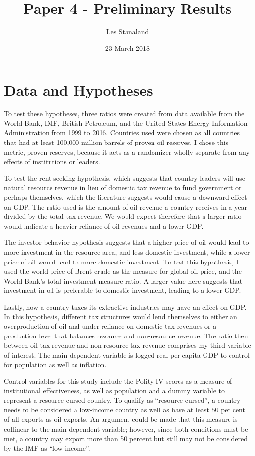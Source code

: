 \documentclass[12pt]{report}   	%
\title{Paper 4 - Preliminary Results}
\author{Les Stanaland}
\date{23 March 2018}							%
\begin{document}
\maketitle
\section*{Data and Hypotheses}
To test these hypotheses, three ratios were created from data available from the World Bank, IMF, British Petroleum, and the United States Energy Information Administration from 1999 to 2016. Countries used were chosen as all countries that had at least 100,000 million barrels of proven oil reserves. I chose this metric, proven reserves, because it acts as a randomizer wholly separate from any effects of institutions or leaders. 

To test the rent-seeking hypothesis, which suggests that country leaders will use natural resource revenue in lieu of domestic tax revenue to fund government or perhaps themselves, which the literature suggests would cause a downward effect on GDP. The ratio used is the amount of oil revenue a country receives in a year divided by the total tax revenue. We would expect therefore that a larger ratio would indicate a heavier reliance of oil revenues and a lower GDP. 

The investor behavior hypothesis suggests that a higher price of oil would lead to more investment in the resource area, and less domestic investment, while a lower price of oil would lead to more domestic investment. To test this hypothesis, I used the world price of Brent crude as the measure for global oil price, and the World Bank's total investment measure ratio. A larger value here suggests that investment in oil is preferable to domestic investment, leading to a lower GDP. 

Lastly, how a country taxes its extractive industries may have an effect on GDP. In this hypothesis, different tax structures would lend themselves to either an overproduction of oil and under-reliance on domestic tax revenues or a production level that balances resource and non-resource revenue. The ratio then between oil tax revenue and non-resource tax revenue comprises my third variable of interest. The main dependent variable is logged real per capita GDP to control for population as well as inflation. 

Control variables for this study include the Polity IV scores as a measure of institutional effectiveness, as well as population and a dummy variable to represent a resource cursed country. To qualify as ``resource cursed'', a country needs to be considered a low-income country as well as have at least 50 per cent of all exports as oil exports. An argument could be made that this measure is collinear to the main dependent variable; however, since both conditions must be met, a country may export more than 50 percent but still may not be considered by the IMF as ``low income''.
\end{document}
